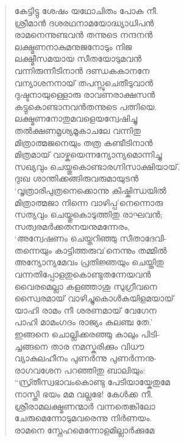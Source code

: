 \begin{verse}
കേട്ടിട്ടു ശേഷം യഥോചിതം പോക നീ.\\
ശ്രീമാന്‍ ദശരഥനാമയോദ്ധ്യാധിപന്‍\\
രാമനെന്നുണ്ടവന്‍ തന്നുടെ നന്ദനന്‍\\
ലക്ഷ്മണനാകുമനുജനോടും നിജ\\
ലക്ഷ്മീസമയായ സീതയോടുമവന്‍\\
വന്നിരുന്നീടിനാന്‍ ദണ്ഡകകാനനേ\\
വന്യാശനനായ് തപസ്സുചെതീടുവാന്‍\\
ദുഷ്ടനായുള്ളൊരു രാവണരാക്ഷസന്‍\\
കട്ടുകൊണ്ടാനവന്‍തന്നുടെ പത്നിയെ.\\
ലക്ഷ്മണനോതുമവളെയന്വേഷിച്ചു\\
തല്‍ക്ഷണമൃശ്യമൂകാചലേ വന്നിതു\\
മിത്രാത്മജനെയും തത്ര കണ്ടീടിനാന്‍\\
മിത്രമായ് വാഴ്കയെന്നന്യോന്യമൊന്നിച്ചു\\
സഖ്യവും ചെയ്തുകൊണ്ടാരഗ്നിസാക്ഷിയായ്.\\
ദുഃഖ ശാന്തിക്കങ്ങിരുവരുമായുടന്‍\\
‘വൃത്രാരിപുത്രനെക്കൊന്നു കിഷ്കിന്ധയില്‍\\
മിത്രാത്മജാ നിന്നെ വാഴിപ്പ’നെന്നൊരു\\
സത്യവും ചെയ്തുകൊടുത്തിതു രാഘവന്‍;\\
സത്വരമര്‍ക്കതനയനുമന്നേരം,\\
‘അന്വേഷണം ചെയ്തറിഞ്ഞു സീതാദേവി-\\
തന്നെയും കാട്ടിത്തരുവ’നെന്നും തമ്മില്‍\\
അന്യോന്യമേവം പ്രതിജ്ഞയും ചെയ്തിതു\\
വന്നതിപ്പോളതുകൊണ്ടുതന്നേയവന്‍\\
വൈരമെല്ലാ കളഞ്ഞാശു സുഗ്രീവനെ\\
സ്വൈരമായ് വാഴിച്ചുകൊള്‍കയിളമയായ്\\
യാഹി രാമം നീ ശരണമായ് വേഗേന\\
പാഹി മാമംഗദം രാജ്യം കുലഞ്ച തേ.’\\
ഇങ്ങനെ ചൊല്ലിക്കരഞ്ഞു കാലും പിടി-\\
ച്ചങ്ങനെ താര നമസ്കരിക്കും വിധൗ\\
വ്യാകുലഹീനം പുണര്‍ന്നു പുണര്‍ന്നനു-\\
രാഗവശേന പറഞ്ഞിതു ബാലിയും:\\
“സ്ര്തീസ്വഭാവംകൊണ്ടു പേടിയായ്കേതുമേ\\
നാസ്തി ഭയം മമ വല്ലഭേ! കേള്‍ക്ക നീ.\\
ശ്രീരാമലക്ഷ്മണന്മാര്‍ വന്നതെങ്കിലോ\\
ചേരുമെന്നോടുമവരെന്നു നിര്‍ണയം.\\
രാമനെ സ്നേഹമെന്നോളമില്ലാര്‍ക്കുമേ\\

\end{verse}
